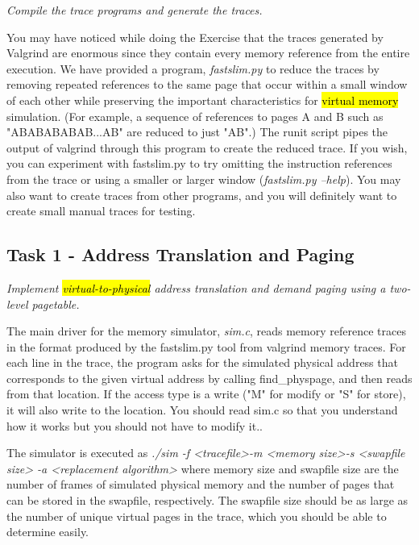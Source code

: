 \documentclass[12pt]{article}
\begin{document}
\bigskip

\noindent \textit{Compile the trace programs and generate the traces.}

\bigskip

\noindent You may have noticed while doing the Exercise that the traces generated
by Valgrind are enormous since they contain every memory reference from the entire
execution. We have provided a program, \textit{fastslim.py} to reduce the traces by removing
repeated references to the same page that occur within a small window of each other
while preserving the important characteristics for \hl{virtual memory} simulation.
(For example, a sequence of references to pages A and B such as "ABABABABAB...AB"
are reduced to just "AB".) The runit script pipes the output of valgrind through
this program to create the reduced trace. If you wish, you can experiment with
fastslim.py to try omitting the instruction references from the trace or using a
smaller or larger window (\textit{fastslim.py --help}). You may also want to create traces
from other programs, and you will definitely want to create small manual traces
for testing.

\subsection{Task 1 - Address Translation and Paging}

\bigskip

\textit{Implement \hl{virtual-to-physical} address translation and demand paging using a
two-level pagetable.}

\bigskip

\noindent The main driver for the memory simulator, \textit{sim.c}, reads memory reference traces in
the format produced by the fastslim.py tool from valgrind memory traces. For each
line in the trace, the program asks for the simulated physical address that
corresponds to the given virtual address by calling find\_physpage, and then reads
from that location. If the access type is a write ("M" for modify or "S" for store),
it will also write to the location. You should read sim.c so that you understand how
it works but you should not have to modify it..

\bigskip

\noindent The simulator is executed as \textit{./sim -f \textless tracefile\textgreater  -m \textless memory size\textgreater  -s \textless swapfile size\textgreater
-a \textless replacement algorithm\textgreater}  where memory size and swapfile size are the number of
frames of simulated physical memory and the number of pages that can be stored in
the swapfile, respectively. The swapfile size should be as large as the number of
unique virtual pages in the trace, which you should be able to determine easily.
\end{document}
